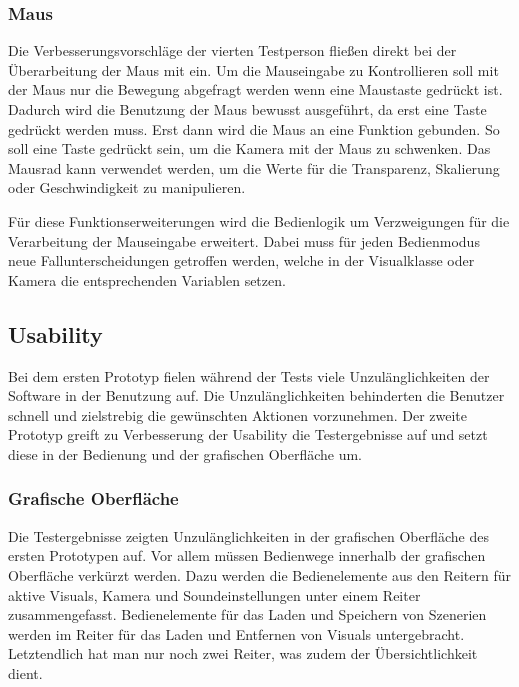 \subsubsection{Maus}

Die Verbesserungsvorschl\"age der vierten Testperson flie\ss{}en direkt bei der \"Uberarbeitung der Maus mit ein.
Um die Mauseingabe zu Kontrollieren soll mit der Maus nur die Bewegung abgefragt werden wenn eine Maustaste gedr\"uckt ist.
Dadurch wird die Benutzung der Maus bewusst ausgef\"uhrt, da erst eine Taste gedr\"uckt werden muss. Erst dann wird die Maus
an eine Funktion gebunden. So soll eine Taste gedr\"uckt sein, um die Kamera mit der Maus zu schwenken. Das Mausrad kann
verwendet werden, um die Werte f\"ur die Transparenz, Skalierung oder Geschwindigkeit zu manipulieren.

F\"ur diese Funktionserweiterungen wird die Bedienlogik um Verzweigungen f\"ur die Verarbeitung der Mauseingabe erweitert.
Dabei muss f\"ur jeden Bedienmodus neue Fallunterscheidungen getroffen werden, welche in der Visualklasse oder Kamera
die entsprechenden Variablen setzen.


\subsection{Usability}

Bei dem ersten Prototyp fielen w\"ahrend der Tests viele Unzul\"anglichkeiten der Software in der Benutzung auf. Die Unzul\"anglichkeiten
behinderten die Benutzer schnell und zielstrebig die gew\"unschten Aktionen vorzunehmen. Der zweite Prototyp greift zu Verbesserung
der Usability die Testergebnisse auf und setzt diese in der Bedienung und der grafischen Oberfl\"ache um.

\subsubsection{Grafische Oberfl\"ache}

Die Testergebnisse zeigten Unzul\"anglichkeiten in der grafischen Oberfl\"ache des ersten Prototypen auf.
Vor allem m\"ussen Bedienwege innerhalb der grafischen Oberfl\"ache verk\"urzt werden. Dazu
werden die Bedienelemente aus den Reitern f\"ur aktive Visuals, Kamera und Soundeinstellungen unter einem Reiter zusammengefasst.
Bedienelemente f\"ur das  Laden und Speichern von Szenerien werden im Reiter f\"ur das Laden und Entfernen von Visuals untergebracht.
Letztendlich hat man nur noch zwei Reiter, was zudem der \"Ubersichtlichkeit dient.

